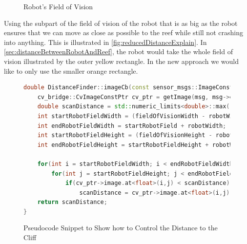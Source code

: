 \documentclass[twoside, 12pt]{article}
\begin{document}
\begin{figure}
\vspace{-28pt}
  \begin{center}
  \end{center}
\vspace{-20pt}
  \caption{Robot's Field of Vision}
  \label{fig:reducedDistanceExplain}
\vspace{20pt}
\end{figure}

Using the subpart of the field of vision of the robot that is as big as the robot ensures that we can move as close as possible to the reef while still not crashing into anything. This is illustrated in \autoref{fig:reducedDistanceExplain}. In \autoref{sec:distanceBetweenRobotAndReef}, the robot would take the whole field of vision illustrated by the outer yellow rectangle. In the new approach we would like to only use the smaller orange rectangle.\\

\begin{figure}
\vspace{-2pt}
\begin{lstlisting}[language=C++]
double DistanceFinder::imageCb(const sensor_msgs::ImageConstPtr& msg) {
	cv_bridge::CvImageConstPtr cv_ptr = getImage(msg, msg->encoding);
	double scanDistance = std::numeric_limits<double>::max();
	int startRobotFieldWidth = (fieldOfVisionWidth - robotWidth)/2;
	int endRobotFieldWidth = startRobotField + robotWidth;
	int startRobotFieldHeight = (fieldOfVisionHeight - robotHeight)/2;
	int endRobotFieldHeight = startRobotFieldHeight + robotWidth;
	
	for(int i = startRobotFieldWidth; i < endRobotFieldWidth; i++)
		for(int j = startRobotFieldHeight; j < endRobotFieldHeight; j++)
			if(cv_ptr->image.at<float>(i,j) < scanDistance)
				scanDistance = cv_ptr->image.at<float>(i,j);
	return scanDistance;
}
\end{lstlisting} 
\vspace{-38pt}
  \caption{Pseudocode Snippet to Show how to Control the Distance to the Cliff}
  \label{fig:codeReducedDistance}
  \vspace{60pt}
\end{figure}
\end{document}
